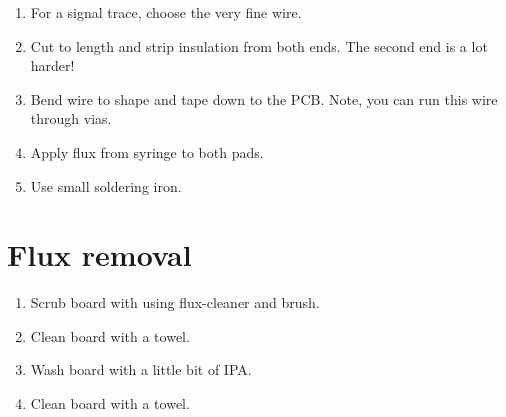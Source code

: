 \begin{enumerate}
\item For a signal trace, choose the very fine wire.

\item Cut to length and strip insulation from both ends.  The second
  end is a lot harder!

\item Bend wire to shape and tape down to the PCB.  Note, you can run
  this wire through vias.

\item Apply flux from syringe to both pads.

\item Use small soldering iron.  
\end{enumerate}


\section{Flux removal}

\begin{enumerate}
\item Scrub board with using flux-cleaner and brush.
\item Clean board with a towel.
\item Wash board with a little bit of IPA.
\item Clean board with a towel.  
\end{enumerate}
